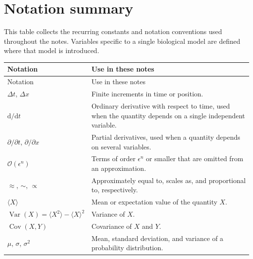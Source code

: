 \clearpage
\section{Notation summary}
\label{app:notation}
This table collects the recurring constants and notation conventions used throughout the notes.
Variables specific to a single biological model are defined where that model is introduced.


{\small
\renewcommand{\arraystretch}{1.15}
\begin{longtable}{@{}p{}p{}@{}}
\hline
Notation & Use in these notes \\
\hline
\endfirsthead

\hline
Notation & Use in these notes \\
\hline
\endhead

\hline
\endfoot

$\Delta t$, $\Delta x$ & Finite increments in time or position. \\

$\mathrm{d}/\mathrm{d}t$ & Ordinary derivative with respect to time, used when the quantity depends on a single independent variable. \\

$\partial/\partial t$, $\partial/\partial x$ & Partial derivatives, used when a quantity depends on several variables. \\

$\mathcal{O}(\epsilon^n)$ & Terms of order $\epsilon^n$ or smaller that are omitted from an approximation. \\

$\approx$, $\sim$, $\propto$ & Approximately equal to, scales as, and proportional to, respectively. \\

$\langle X\rangle$ & Mean or expectation value of the quantity $X$. \\

$\operatorname{Var}(X) = \langle X^2\rangle-\langle X\rangle^2$ & Variance of $X$. \\


$\operatorname{Cov}(X,Y)$ & Covariance of $X$ and $Y$. \\

$\mu$, $\sigma$, $\sigma^2$ & Mean, standard deviation, and variance of a probability distribution. \\


\end{longtable}}
